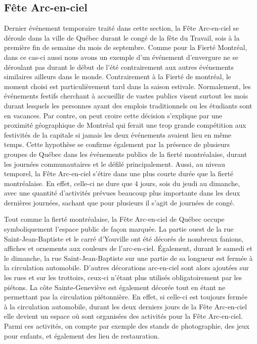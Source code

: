 \subsection{Fête Arc-en-ciel}
\label{subsec:fetearcenciel}
Dernier événement temporaire traité dans cette section, la Fête Arc-en-ciel se déroule dans la ville de Québec durant le congé de la fête du Travail, sois à la première fin de semaine du mois de septembre.
Comme pour la Fierté Montréal, dans ce cas-ci aussi nous avons un exemple d'un événement d'envergure ne se déroulant pas durant le début de l'été contrairement aux autres événements similaires ailleurs dans le monde.
Contrairement à la Fierté de montréal, le moment choisi est particulièrement tard dans la saison estivale.
Normalement, les événements festifs cherchant à accueillir de vastes publics visent surtout les mois durant lesquels les personnes ayant des emplois traditionnels ou les étudiants sont en vacances.
Par contre, on peut croire cette décision s'explique par une proximité géographique de Montréal qui ferait une trop grande compétition aux festivités de la capitale si jamais les deux événements avaient lieu en même temps.
Cette hypothèse se confirme également par la présence de plusieurs groupes de Québec dans les événements publics de la fierté montréalaise, durant les journées communautaires et le défilé principalement.
Aussi, au niveau temporel, la Fête Arc-en-ciel s'étire dans une plus courte durée que la fierté montréalaise.
En effet, celle-ci ne dure que 4 jours, sois du jeudi au dimanche, avec une quantité d'activités prévues beaucoup plus importante dans les deux dernières journées, sachant que pour plusieurs il s'agit de journées de congé.

Tout comme la fierté montréalaise, la Fête Arc-en-ciel de Québec occupe symboliquement l'espace public de façon marquée. 
La partie ouest de la rue Saint-Jean-Baptiste et le carré d'Youville ont été décorés de nombreux fanions, affiches et ornements aux couleurs de l'arc-en-ciel.
Également, durant le samedi et le dimanche, la rue Saint-Jean-Baptiste sur une partie de sa longueur est fermée à la circulation automobile.
D'autres décorations arc-en-ciel sont alors ajoutées sur les rues et sur les trottoirs, ceux-ci n'étant plus utilisés obligatoirement par les piétons.
La côte Sainte-Geneviève est également décorée tout en étant ne permettant pas la circulation piétonnière.
En effet, si celle-ci est toujours fermée à la circulation automobile, durant les deux derniers jours de la Fête Arc-en-ciel elle devient un espace où sont organisées des activités pour la Fête Arc-en-ciel. Parmi ces activités, on compte par exemple des stands de photographie, des jeux pour enfants, et également des lieu de restauration.


